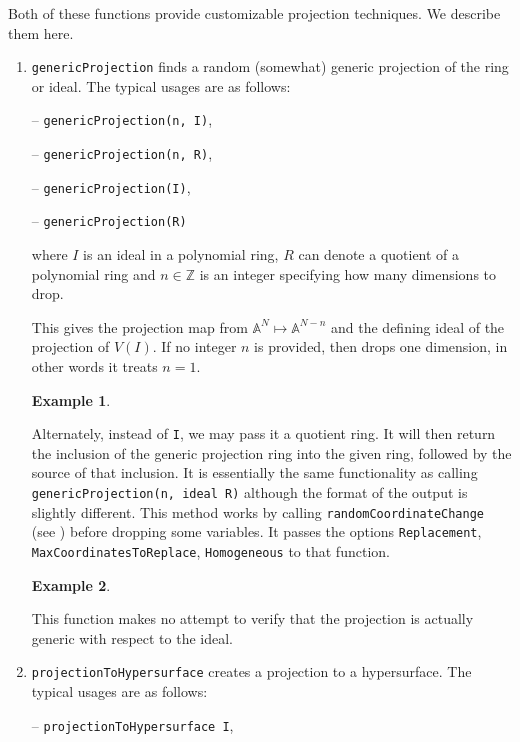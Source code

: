 \documentclass[11pt]{amsart}
\theoremstyle{definition}
\newtheorem{example}{Example}[section]
\begin{document}
Both of these functions provide customizable projection techniques. We describe them here. 


\begin{enumerate}
\item {\tt genericProjection} 
finds a random (somewhat) generic projection of the ring or ideal.
The typical usages are as follows: 
\vspace{1em}

-- {\tt genericProjection(n, I)},

-- {\tt genericProjection(n, R)},


-- {\tt genericProjection(I)},  

-- {\tt genericProjection(R)} 

\vspace{1em}
\noindent where 
$I$ is an ideal 
in a polynomial ring, 
$R$ can denote a quotient of a polynomial ring and 
$n\in \mathbb{Z}$ is
an integer specifying how many dimensions to drop. 

This gives the projection map from $\mathbb{A}^N \mapsto\mathbb{A}^{N-n}$ and the defining ideal of the projection of $V(I)$. If no integer $n$ is provided, then drops one dimension, in other words it treats $n = 1$. 

\begin{example}
	\end{example}

Alternately, instead of {\tt I}, we may pass it a quotient ring.  It will then return the inclusion of the generic projection ring into the given ring, followed by the source of that inclusion.  It is essentially the same functionality as calling {\tt genericProjection(n, ideal R)} although the format of the output is slightly different. This method works by calling {\tt randomCoordinateChange} (see ) before dropping some variables.  It passes the options {\tt Replacement}, {\tt MaxCoordinatesToReplace}, {\tt Homogeneous} to that function.


\begin{example}
	\end{example}

This function makes no attempt to verify that the projection is actually generic with respect to the ideal.

\vspace{1em} 
\item {\tt projectionToHypersurface} creates a projection to a hypersurface. The typical usages are as follows: 

\vspace{1em}
-- {\tt projectionToHypersurface I},


\end{enumerate}
\end{document}

